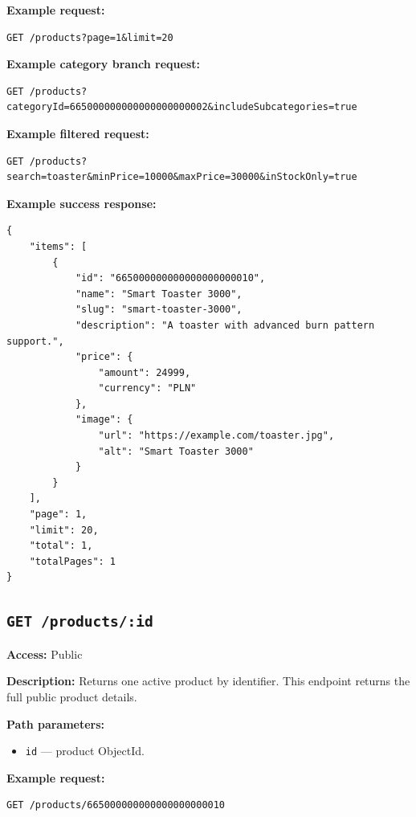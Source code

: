 \textbf{Example request:}

\begin{verbatim}
GET /products?page=1&limit=20
\end{verbatim}

\textbf{Example category branch request:}

\begin{verbatim}
GET /products?categoryId=665000000000000000000002&includeSubcategories=true
\end{verbatim}

\textbf{Example filtered request:}

\begin{verbatim}
GET /products?search=toaster&minPrice=10000&maxPrice=30000&inStockOnly=true
\end{verbatim}

\pagebreak
\textbf{Example success response:}

\begin{verbatim}
{
    "items": [
        {
            "id": "665000000000000000000010",
            "name": "Smart Toaster 3000",
            "slug": "smart-toaster-3000",
            "description": "A toaster with advanced burn pattern support.",
            "price": {
                "amount": 24999,
                "currency": "PLN"
            },
            "image": {
                "url": "https://example.com/toaster.jpg",
                "alt": "Smart Toaster 3000"
            }
        }
    ],
    "page": 1,
    "limit": 20,
    "total": 1,
    "totalPages": 1
}
\end{verbatim}

\subsection{\texttt{GET /products/:id}}

\textbf{Access:} Public

\textbf{Description:} Returns one active product by identifier. This endpoint returns the full public product details.

\textbf{Path parameters:}

\begin{itemize}
    \item \texttt{id} --- product ObjectId.
\end{itemize}

\textbf{Example request:}

\begin{verbatim}
GET /products/665000000000000000000010
\end{verbatim}

